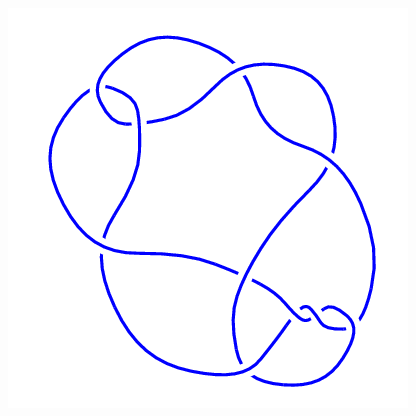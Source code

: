 \begin{figure}[H]
\begin{minipage}[b]{.18\linewidth}
    \end{minipage}
    \begin{minipage}[b]{.18\linewidth}
        \centering
        \includegraphics[width=\linewidth]{../data/10_31.png}
    \end{minipage}
\end{figure}
